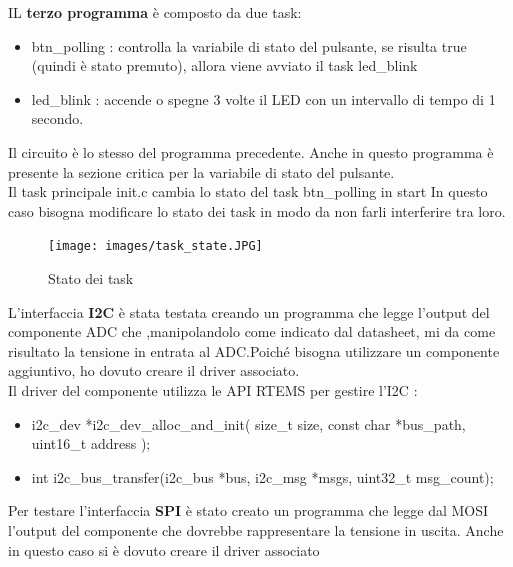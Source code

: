 \documentclass[12pt, a4paper, titlepage, oneside]{book}
\begin{document}
\begin{flushleft}
\newpage
IL \textbf{terzo programma} è composto da due task:
\begin{itemize}
    \item btn\_polling : controlla la variabile di stato del pulsante, se risulta true (quindi è stato  premuto), allora viene avviato il task led\_blink
    \item led\_blink : accende o spegne 3 volte il LED con un intervallo di tempo di 1 secondo.
\end{itemize}
Il circuito è lo stesso del programma precedente.
Anche in questo programma è presente la sezione critica per la variabile di stato del pulsante.\\
Il task principale init.c cambia lo stato del task btn\_polling in start 
In questo caso bisogna modificare lo stato dei task in modo da non farli interferire tra loro.\\
\begin{figure}[h]
    \centering
    \texttt{[image: images/task\_state.JPG]}
    \caption{Stato dei task}
    \label{fig:Stato dei task}
\end{figure}
\newpage
L'interfaccia \textbf{I2C} è stata testata creando un programma che legge l'output del componente ADC che ,manipolandolo come indicato dal datasheet, mi da come risultato la tensione in entrata al ADC.Poiché bisogna utilizzare un componente aggiuntivo, ho dovuto creare il driver associato.\\
Il driver del componente utilizza le API RTEMS per gestire l'I2C :
\begin{itemize}
    \item i2c\_dev *i2c\_dev\_alloc\_and\_init(
  size\_t size,
  const char *bus\_path,
  uint16\_t address
);
    \item int i2c\_bus\_transfer(i2c\_bus *bus, i2c\_msg *msgs, uint32\_t msg\_count);
\end{itemize}
Per testare l'interfaccia \textbf{SPI} è stato creato un programma che legge dal MOSI l'output del componente che dovrebbe rappresentare la tensione in uscita. Anche in questo caso si è dovuto creare il driver associato \\
\newpage

\end{flushleft}
\end{document}

